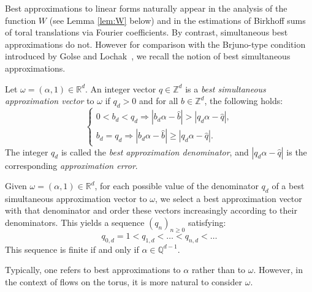 \documentclass[12pt,reqno,a4paper]{amsart}%
\numberwithin{equation}{section}
\newcommand{\Rr}{{\mathbb{R}}}
\newcommand{\Zz}{{\mathbb{Z}}}
\newcommand{\tcm}{\textcolor{magenta}}
\begin{document}
	

Best approximations to linear forms naturally appear in the analysis of the function $W$ (see Lemma \ref{lem:W} below) and in the estimations of Birkhoff sums of toral translations via Fourier coefficients. By contrast, simultaneous best approximations do not.  
	However for comparison with the Brjuno-type condition introduced by Golse and Lochak~\cite{GoLo}, we  recall the notion of best simultaneous approximations.
	
	\begin{defn}
		Let $\omega = (\alpha,1) \in \Rr^d$.
		An integer vector $q \in \Zz^d$ is a \emph{best simultaneous approximation vector} to $\omega$ if $q_d > 0$ and for all $b \in \Zz^d$, the following holds:
		\[
		\left\{\begin{array}{ll}
			0 < b_d < q_d \Rightarrow |b_d\alpha - \hat b| > |q_d\alpha - \hat q|, \\
			b_d = q_d \Rightarrow |b_d\alpha - \hat b| \geq |q_d\alpha - \hat q|.
		\end{array}
		\right.
		\]
		The integer $q_d$ is called the \emph{best approximation denominator}, and $|q_d\alpha - \hat q|$ is the corresponding \emph{approximation error}.
	\end{defn}
	
	Given $\omega=(\alpha,1)\in \Rr^d$, for each possible value of the denominator $q_d$ of a best simultaneous approximation vector to $\omega$, we select a best approximation vector with that denominator and order these vectors increasingly according to their denominators. This yields a sequence $(q_n)_{n\geq0}$ satisfying:
	\[
	q_{0,d} = 1 < q_{1,d} < \dots < q_{n,d} < \dots
	\]
	This sequence is finite if and only if $\alpha \in \mathbb Q^{d-1}$. 
	
	Typically, one refers to best approximations to $\alpha$ rather than to $\omega$. However, in the context of  flows on the torus, it is more natural to consider $\omega$.
	
	

	
\end{document}
